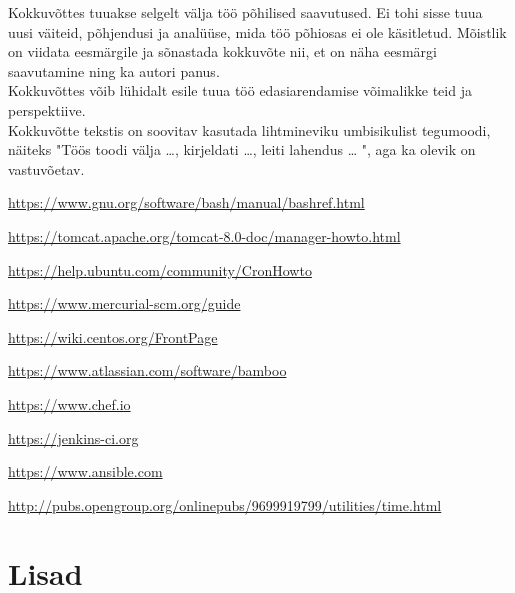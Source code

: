 \documentclass[12pt]{report}
\begin{document}
Kokkuvõttes tuuakse selgelt välja töö põhilised saavutused. Ei tohi sisse tuua uusi väiteid, põhjendusi ja analüüse, mida töö põhiosas ei ole käsitletud. Mõistlik on viidata eesmärgile ja sõnastada kokkuvõte nii, et on näha eesmärgi saavutamine ning ka autori panus.\\

Kokkuvõttes võib lühidalt esile tuua töö edasiarendamise võimalikke teid ja perspektiive.\\

Kokkuvõtte tekstis on soovitav kasutada lihtmineviku umbisikulist tegumoodi, näiteks "Töös toodi välja …, kirjeldati …, leiti lahendus … ", aga ka olevik on vastuvõetav.

  \newpage
  
  \begin{thebibliography}{9}
    \label{kasutatud-materjalid}
  
    \url{https://www.gnu.org/software/bash/manual/bashref.html}
    
    \url{https://tomcat.apache.org/tomcat-8.0-doc/manager-howto.html}
  
    \url{https://help.ubuntu.com/community/CronHowto}
  
    \url{https://www.mercurial-scm.org/guide}
  
    \url{https://wiki.centos.org/FrontPage}
  
    \url{https://www.atlassian.com/software/bamboo}
  
    \url{https://www.chef.io}
  
    \url{https://jenkins-ci.org}
  
    \url{https://www.ansible.com}
    
    \url{http://pubs.opengroup.org/onlinepubs/9699919799/utilities/time.html}
 
  \end{thebibliography}

  \newpage
  
  \section*{Lisad}
  \label{lisad}
  
\end{document}
